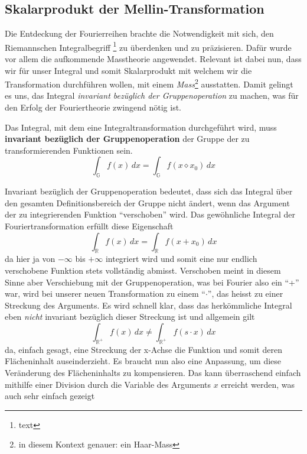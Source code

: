 \subsection{Skalarprodukt der Mellin-Transformation
\label{mellin:subsection:skalarprodukt}}
Die Entdeckung der Fourierreihen brachte die Notwendigkeit mit sich, den Riemannschen Integralbegriff
\footnote{text} zu überdenken und zu präzisieren.
Dafür wurde vor allem die aufkommende Masstheorie angewendet.
Relevant ist dabei nun, dass wir für unser Integral und somit Skalarprodukt mit welchem wir die Transformation durchführen wollen, 
mit einem \emph{Mass}\footnote{in diesem Kontext genauer: ein Haar-Mass} ausstatten. 
Damit gelingt es uns, das Integral \emph{invariant bezüglich der Gruppenoperation} zu machen, was für den Erfolg der Fouriertheorie 
zwingend nötig ist. 
\begin{satz}
    \label{buch:papers:mellin:teil2:satz:int}
    Das Integral, mit dem eine Integraltransformation durchgeführt wird, muss \textbf{invariant bezüglich der Gruppenoperation} 
    der Gruppe der zu transformierenden Funktionen sein.
    \[
        \int_\mathbb{G} f(x)\,dx = \int_\mathbb{G} f(x \diamond x_0)\,dx
    \]
\end{satz}
Invariant bezüglich der Gruppenoperation bedeutet, dass sich das Integral über den gesamten Definitionsbereich der Gruppe nicht 
ändert, wenn das Argument der zu integrierenden Funktion ``verschoben'' wird. 
Das gewöhnliche Integral der Fouriertransformation erfüllt diese Eigenschaft 
\begin{equation}
    \int_\mathbb{R} f(x)\,dx = \int_\mathbb{R} f(x + x_0)\,dx
\end{equation}
da hier ja von $-\infty$ bis $+\infty$ integriert wird und somit eine nur endlich verschobene Funktion stets vollständig abmisst.
Verschoben meint in diesem Sinne aber Verschiebung mit der Gruppenoperation, was bei Fourier also ein ``+'' war, wird bei unserer 
neuen Transformation zu einem ``$\cdot$'', das heisst zu einer Streckung des Arguments. 
Es wird schnell klar, dass das herkömmliche Integral eben \emph{nicht} invariant bezüglich dieser Streckung ist und allgemein gilt 
\begin{equation}
    \int_\mathbb{R^+} f(x)\,dx \neq \int_\mathbb{R^+} f(s \cdot x)\,dx
\end{equation}
da, einfach gesagt, eine Streckung der x-Achse die Funktion und somit deren Flächeninhalt auseinderzieht.
Es braucht nun also eine Anpassung, um diese Veränderung des Flächeninhalts zu kompensieren.
Das kann überraschend einfach mithilfe einer Division durch die Variable des Arguments $x$ erreicht werden, was auch sehr einfach gezeigt 
